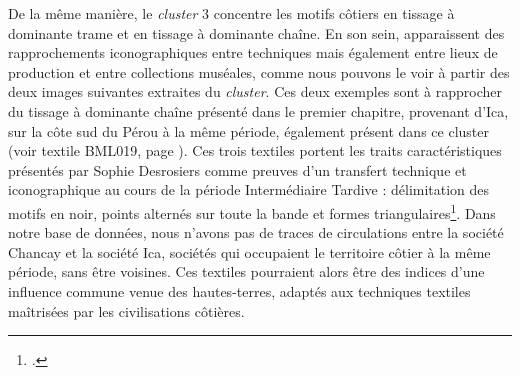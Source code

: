 De la même manière, le \textit{cluster} 3 concentre les motifs côtiers en tissage à dominante trame et en tissage à dominante chaîne. En son sein, apparaissent des rapprochements iconographiques entre techniques mais également entre lieux de production et entre collections muséales, comme nous pouvons le voir à partir des deux images suivantes extraites du \textit{cluster}. Ces deux exemples sont à rapprocher du tissage à dominante chaîne présenté dans le premier chapitre, provenant d'Ica, sur la côte sud du Pérou à la même période, également présent dans ce cluster (voir textile BML019, page \pageref{fig:BML019}). Ces trois textiles portent les traits caractéristiques présentés par Sophie Desrosiers comme preuves d'un transfert technique et iconographique au cours de la période Intermédiaire Tardive : délimitation des motifs en noir, points alternés sur toute la bande et formes triangulaires\footcite[p.~5]{desrosiersRevisitingOcucajeOpened2008}. Dans notre base de données, nous n'avons pas de traces de circulations entre la société Chancay et la société Ica, sociétés qui occupaient le territoire côtier à la même période, sans être voisines. Ces textiles pourraient alors être des indices d'une influence commune venue des hautes-terres, adaptés aux techniques textiles maîtrisées par les civilisations côtières.


